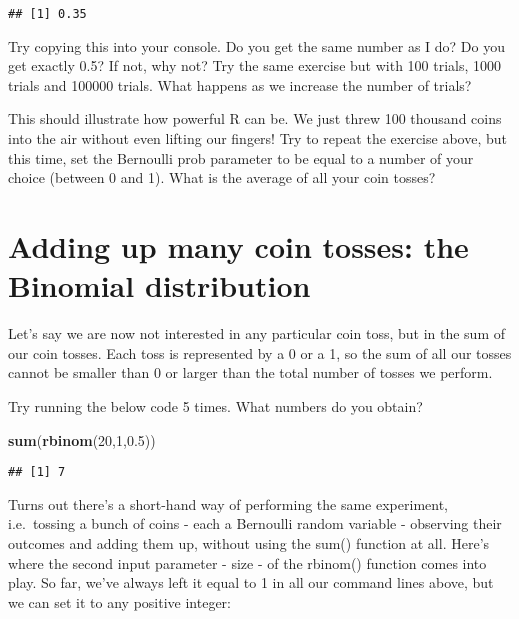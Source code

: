 \documentclass[
]{book}
\newenvironment{Shaded}{\begin{snugshade}}{\end{snugshade}}
\newcommand{\DecValTok}[1]{\textcolor[rgb]{0.00,0.00,0.81}{#1}}
\newcommand{\FloatTok}[1]{\textcolor[rgb]{0.00,0.00,0.81}{#1}}
\newcommand{\KeywordTok}[1]{\textcolor[rgb]{0.13,0.29,0.53}{\textbf{#1}}}
\newcommand{\NormalTok}[1]{#1}
\begin{document}
\begin{verbatim}
## [1] 0.35
\end{verbatim}

Try copying this into your console. Do you get the same number as I do? Do you get exactly 0.5? If not, why not? Try the same exercise but with 100 trials, 1000 trials and 100000 trials. What happens as we increase the number of trials?

This should illustrate how powerful R can be. We just threw 100 thousand coins into the air without even lifting our fingers! Try to repeat the exercise above, but this time, set the Bernoulli prob parameter to be equal to a number of your choice (between 0 and 1). What is the average of all your coin tosses?

\hypertarget{adding-up-many-coin-tosses-the-binomial-distribution}{%
\section{Adding up many coin tosses: the Binomial distribution}\label{adding-up-many-coin-tosses-the-binomial-distribution}}

Let's say we are now not interested in any particular coin toss, but in the sum of our coin tosses. Each toss is represented by a 0 or a 1, so the sum of all our tosses cannot be smaller than 0 or larger than the total number of tosses we perform.

Try running the below code 5 times. What numbers do you obtain?

\begin{Shaded}
\begin{Highlighting}[]
\KeywordTok{sum}\NormalTok{(}\KeywordTok{rbinom}\NormalTok{(}\DecValTok{20}\NormalTok{,}\DecValTok{1}\NormalTok{,}\FloatTok{0.5}\NormalTok{))}
\end{Highlighting}
\end{Shaded}

\begin{verbatim}
## [1] 7
\end{verbatim}

Turns out there's a short-hand way of performing the same experiment, i.e.~tossing a bunch of coins - each a Bernoulli random variable - observing their outcomes and adding them up, without using the sum() function at all. Here's where the second input parameter - size - of the rbinom() function comes into play. So far, we've always left it equal to 1 in all our command lines above, but we can set it to any positive integer:
\end{document}
